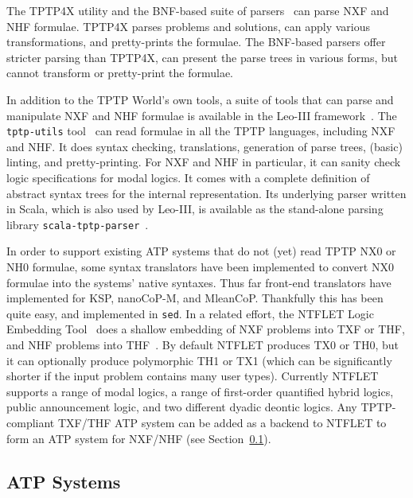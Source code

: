 \documentclass{ceurart}
\begin{document}
The TPTP4X utility and the BNF-based suite of parsers~\cite{VS06} can parse NXF and NHF formulae.
TPTP4X parses problems and solutions, can apply various transformations, and pretty-prints the 
formulae.
The BNF-based parsers offer stricter parsing than TPTP4X, can present the parse trees in
various forms, but cannot transform or pretty-print the formulae.

In addition to the TPTP World's own tools, a suite of tools that can parse and manipulate 
NXF and NHF formulae is available in the Leo-III framework~\cite{SB21}.
The {\tt tptp-utils} tool~\cite{Ste22-TU} can read formulae in all the TPTP languages, including 
NXF and NHF.
It does syntax checking, translations, generation of parse trees, (basic) linting, and
pretty-printing.
For NXF and NHF in particular, it can sanity check logic specifications for modal logics.
It comes with a complete definition of abstract syntax trees for the internal representation.
Its underlying parser written in Scala, which is also used by Leo-III, is available as the 
stand-alone parsing library {\tt scala-tptp-parser}~\cite{Ste21}.

In order to support existing ATP systems that do not (yet) read TPTP NX0 or NH0 formulae,
some syntax translators have been implemented to convert NX0 formulae into the systems'
native syntaxes.
Thus far front-end translators have implemented for KSP, nanoCoP-M, and MleanCoP.
Thankfully this has been quite easy, and implemented in {\tt sed}.
In a related effort, the NTFLET Logic Embedding Tool~\cite{Ste22} does a shallow embedding of 
NXF problems into TXF or THF, and NHF problems into THF~\cite{BP13,BR13,GSB17,GS18}.
By default NTFLET produces TX0 or TH0, but it can optionally produce polymorphic TH1 or TX1
(which can be significantly shorter if the input problem contains many user types).
Currently NTFLET supports a range of modal logics, a range of first-order quantified hybrid 
logics, public announcement logic, and two different dyadic deontic logics.
Any TPTP-compliant TXF/THF ATP system can be added as a backend to NTFLET to form an 
ATP system for NXF/NHF (see Section~\ref{ATPSystems}).

\subsection{ATP Systems}
\label{ATPSystems}
\end{document}
